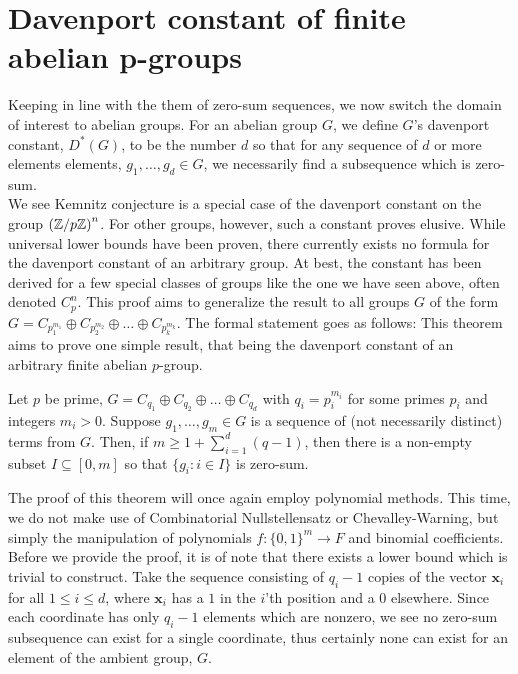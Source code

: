 \chapter{Davenport constant of finite abelian p-groups}
Keeping in line with the them of zero-sum sequences, we now switch the domain of interest to abelian groups. For an abelian group \(G\), we define \(G\)'s davenport constant, \(D^{*}\left( G \right) \), to be the number \(d\) so that for any sequence of \(d\) or more elements elements, \(g_1, \ldots, g_{d} \in G\), we necessarily find a subsequence which is zero-sum.\\
We see Kemnitz conjecture is a special case of the davenport constant on the group \( \left( \mathbb{Z} / p\mathbb{Z} \right)^{n} \). For other groups, however, such a constant proves elusive. While universal lower bounds have been proven, there currently exists no formula for the davenport constant of an arbitrary group. At best, the constant has been derived for a few special classes of groups like the one we have seen above, often denoted \(C_{p}^{n}\). This proof aims to generalize the result to all groups \(G\) of the form \(G = C_{p_1^{m_1}} \oplus C_{p_2^{m_2}} \oplus \ldots \oplus C_{p_{k}^{m_{k}}}\). The formal statement goes as follows:
This theorem aims to prove one simple result, that being the davenport constant of an arbitrary finite abelian \(p\)-group.
\begin{theorem}
	Let \(p\) be prime, \(G = C_{q_1} \oplus C_{q_2} \oplus \ldots \oplus C_{q_{d}}\) with \(q_{i} = p_{i}^{m_{i}}\) for some primes \(p_{i}\) and integers \(m_{i} > 0\). Suppose \(g_1, \ldots, g_{m} \in G\) is a sequence of (not necessarily distinct) terms from \(G\). Then, if \(m\ge 1 + \sum_{i= 1}^{d} \left( q-1 \right) \), then there is a non-empty subset \(I \subseteq \left[ 0, m \right]  \) so that \(\{g_{i} : i \in I\} \) is zero-sum.
\end{theorem}
The proof of this theorem will once again employ polynomial methods. This time, we do not make use of Combinatorial Nullstellensatz or Chevalley-Warning, but simply the manipulation of polynomials \(f: \{0, 1\} ^{m} \to F\) and binomial coefficients. Before we provide the proof, it is of note that there exists a lower bound which is trivial to construct. Take the sequence consisting of \(q_{i} - 1\) copies of the vector \(\textbf{x}_{i}\) for all \(1 \le i \le d\),  where \(\textbf{x}_{i}\) has a \(1\) in the \(i\)'th position and a \(0\) elsewhere. Since each coordinate has only \(q_{i} - 1\) elements which are nonzero, we see no zero-sum subsequence can exist for a single coordinate, thus certainly none can exist for an element of the ambient group, \(G\).
